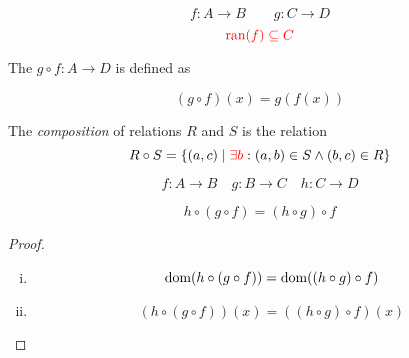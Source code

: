
\begin{frame}{}
  \begin{center}
  \end{center}

\end{frame}

\begin{frame}{}
  \begin{definition}[Composition]
    \[
      f: A \to B \qquad g: C \to D
    \]
    \[
      \textcolor{red}{\text{ran}(f) \subseteq C}
    \]

    The  $g \circ f: A \to D$ is defined as

    \[
      (g \circ f) (x) = g(f(x))
    \]
  \end{definition}

  \pause
  \vspace{0.20cm}
  \begin{center}
  \end{center}

  \vspace{-0.30cm}
  \begin{definition}[Composition]
    The {\it composition} of relations $R$ and $S$ is the relation
    \[
      R \circ S = \{(a, c) \mid \textcolor{red}{\exists b}: (a, b) \in S \land (b, c) \in R\}
    \]
  \end{definition}
\end{frame}

\begin{frame}{}
  \begin{theorem}
    \[
      f: A \to B \quad g: B \to C \quad h: C \to D
    \]

    \[
      h \circ (g \circ f) = (h \circ g) \circ f
    \]
  \end{theorem}

  \pause
  \vspace{0.60cm}
  \begin{proof}
    \pause
    \begin{enumerate}[(i)]
      \item
        \[
          \text{dom}(h \circ (g \circ f)) = \text{dom}((h \circ g) \circ f)
        \]
      \item
        \[
          (h \circ (g \circ f))(x) = ((h \circ g) \circ f)(x)
        \]
    \end{enumerate}
  \end{proof}
\end{frame}

